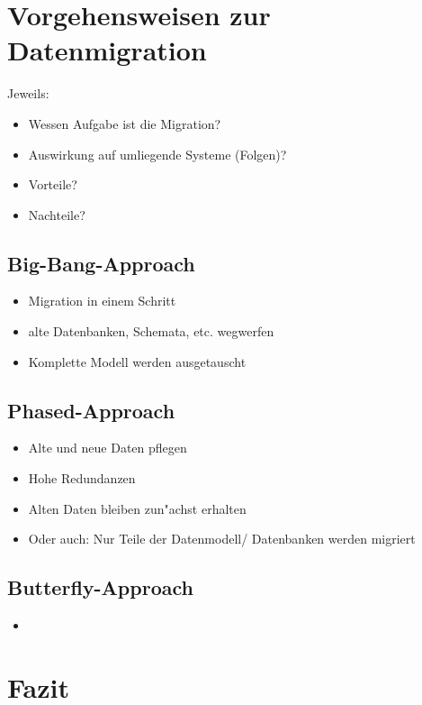 \documentclass[11pt]{scrartcl}
\newif\iffull
\begin{document}
\section{Vorgehensweisen zur Datenmigration}		%

Jeweils:
\begin{itemize}
	\item Wessen Aufgabe ist die Migration?
	\item Auswirkung auf umliegende Systeme (Folgen)?
	\item Vorteile?
	\item Nachteile?
\end{itemize}

\subsection{Big-Bang-Approach}

\begin{itemize}
	\item Migration in einem Schritt
	\item alte Datenbanken, Schemata, etc. wegwerfen
	\item Komplette Modell werden ausgetauscht
\end{itemize}

\subsection{Phased-Approach}

\begin{itemize}
	\item Alte und neue Daten pflegen
	\item Hohe Redundanzen
	\item Alten Daten bleiben zun"achst erhalten
	\item Oder auch: Nur Teile der Datenmodell/ Datenbanken werden migriert
\end{itemize}

\subsection{Butterfly-Approach}

\begin{itemize}
	\item 
\end{itemize}

\section{Fazit}

\iffull
\newpage

\addcontentsline{toc}{section}{\bibname}


\fi
\end{document}
